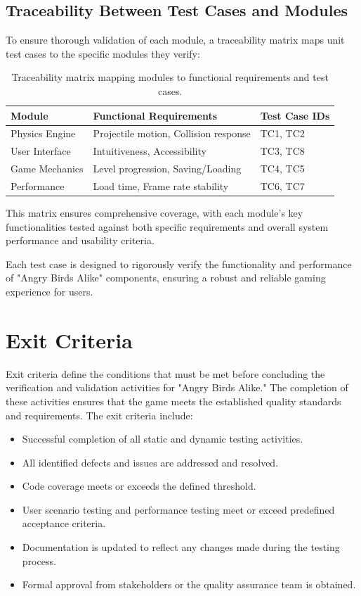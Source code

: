 \documentclass[12pt]{article}
\begin{document}
\subsection{Traceability Between Test Cases and Modules}

To ensure thorough validation of each module, a traceability matrix maps unit test cases to the specific modules they verify:

\begin{table}[H]
\centering
\begin{tabular}{|l|l|l|}
\hline
\textbf{Module} & \textbf{Functional Requirements} & \textbf{Test Case IDs} \\
\hline
Physics Engine & Projectile motion, Collision response & TC1, TC2 \\
User Interface & Intuitiveness, Accessibility & TC3, TC8 \\
Game Mechanics & Level progression, Saving/Loading & TC4, TC5 \\
Performance & Load time, Frame rate stability & TC6, TC7 \\
\hline
\end{tabular}
\caption{Traceability matrix mapping modules to functional requirements and test cases.}
\end{table}

This matrix ensures comprehensive coverage, with each module's key functionalities tested against both specific requirements and overall system performance and usability criteria.


Each test case is designed to rigorously verify the functionality and performance of "Angry Birds Alike" components, ensuring a robust and reliable gaming experience for users.

\section{Exit Criteria}
Exit criteria define the conditions that must be met before concluding the verification and validation activities for "Angry Birds Alike." The completion of these activities ensures that the game meets the established quality standards and requirements. The exit criteria include:
\begin{itemize}
    \item Successful completion of all static and dynamic testing activities.
    \item All identified defects and issues are addressed and resolved.
    \item Code coverage meets or exceeds the defined threshold.
    \item User scenario testing and performance testing meet or exceed predefined acceptance criteria.
    \item Documentation is updated to reflect any changes made during the testing process.
    \item Formal approval from stakeholders or the quality assurance team is obtained.
\end{itemize}
\end{document}
